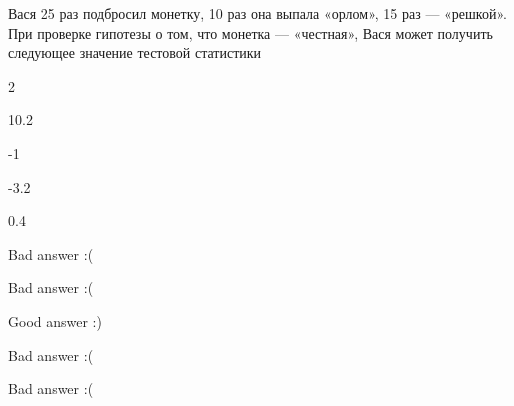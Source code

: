 
\begin{question}
Вася 25 раз подбросил монетку, 10 раз она выпала «орлом», 15 раз ---
«решкой». При проверке гипотезы о том, что монетка — «честная», Вася
может получить следующее значение тестовой статистики
\begin{answerlist}
  \item 2
  \item 10.2
  \item -1
  \item -3.2
  \item 0.4
\end{answerlist}
\end{question}

\begin{solution}
\begin{answerlist}
  \item Bad answer :(
  \item Bad answer :(
  \item Good answer :)
  \item Bad answer :(
  \item Bad answer :(
\end{answerlist}
\end{solution}

